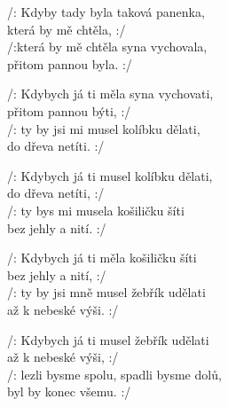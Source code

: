 
\ve{}
/: Kdyby tady byla taková panenka,\\
která by mě chtěla, :/\\
/:která by mě chtěla syna vychovala,\\
přitom pannou byla. :/

\ve{}
/: Kdybych já ti měla syna vychovati,\\
přitom pannou býti, :/\\
/: ty by jsi mi musel kolíbku dělati,\\
do dřeva netíti. :/

\ve{}
/: Kdybych já ti musel kolíbku dělati,\\
do dřeva netíti, :/\\
/: ty bys mi musela košiličku šíti\\
bez jehly a nití. :/

\ve{}
/: Kdybych já ti měla košiličku šíti\\
bez jehly a nití, :/\\
/: ty by jsi mně musel žebřík udělati\\
až k nebeské výši. :/

\ve{}
/: Kdybych já ti musel žebřík udělati\\
až k nebeské výši, :/\\
/: lezli bysme spolu, spadli bysme dolů,\\
byl by konec všemu. :/ 

\esong